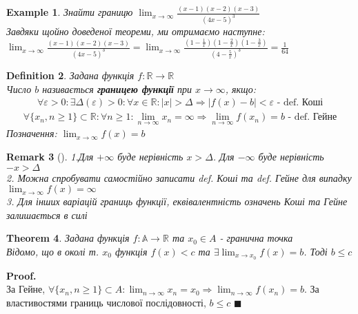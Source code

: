 \documentclass[a4paper, 14pt]{extarticle}
\def\huge{\displaystyle}
\theoremstyle{theoremdd}
\newtheorem{theorem}{Theorem}[subsection]
\theoremstyle{theoremdd}
\newtheorem{definition}[theorem]{Definition}
\theoremstyle{theoremdd}
\theoremstyle{theoremdd}
\newtheorem{example}[theorem]{Example}
\theoremstyle{theoremdd}
\theoremstyle{theoremdd}
\newtheorem{remark}[theorem]{Remark}
\theoremstyle{theoremdd}
\theoremstyle{theoremdd}
\newenvironment{pf}{\vspace*{-3mm} \textbf{Proof. \\}}{$\blacksquare$}
\begin{document}
	\begin{example}
	Знайти границю $\huge \lim_{x \to \infty} \frac{(x-1)(x-2)(x-3)}{(4x-5)^3}$\\
	Завдяки щойно доведеної теореми, ми отримаємо наступне:\\
	$\huge \lim_{x \to \infty} \frac{(x-1)(x-2)(x-3)}{(4x-5)^3} = \lim_{x \to \infty} \frac{(1-\frac{1}{x})(1-\frac{2}{x})(1-\frac{3}{x})}{(4-\frac{5}{x})^3} = \frac{1}{64}$
	\end{example}
	
	\begin{definition}
	Задана функція $f: \mathbb{R} \to \mathbb{R}$ \\
	Число $b$ називається \textbf{границею функції} при $x \to \infty$, якщо:
	\begin{align*}
	\forall \varepsilon > 0: \exists \Delta(\varepsilon) > 0: \forall x \in \mathbb{R}: |x|>\Delta \Rightarrow |f(x)-b|<\varepsilon \textrm{ - def. Коші}
	\end{align*}
	\begin{align*}
	\forall \{x_n, n \geq 1\} \subset \mathbb{R}: \forall n \geq 1: \lim_{n \to \infty} x_n = \infty \Rightarrow \lim_{n \to \infty} f(x_n) = b \textrm{ - def. Гейне}
	\end{align*}
	Позначення: $\huge \lim_{x \to \infty} f(x) = b$
	\end{definition}
	
	\begin{remark}[\hspace{0.1cm}]
	1.Для $+\infty$ буде нерівність $x > \Delta$. Для $-\infty$ буде нерівність $-x > \Delta$\\
	2. Можна спробувати самостійно записати def. Коші та def. Гейне для випадку $\huge \lim_{x \to \infty} f(x) = \infty$\\
	3. Для інших варіацій границь функції, еквівалентність означень Коші та Гейне залишається в силі
	\end{remark}
	
	\begin{theorem}
	Задана функція $f: \mathbb{A} \to \mathbb{R}$ та $x_0 \in A$ - гранична точка\\
Відомо, що в околі т. $x_0$ функція $f(x) < c$ та $\exists \huge \lim_{x \to x_0} f(x) = b$. Тоді $b \leq c$
	\end{theorem}

	\begin{pf}
За Гейне, $\huge \forall \{x_n, n \geq 1\} \subset A:  \lim_{n \to \infty} x_n = x_0 \Rightarrow \lim_{n \to \infty} f(x_n) = b$. За властивостями границь числової послідовності, $b \leq c$
	\end{pf}
\end{document}
